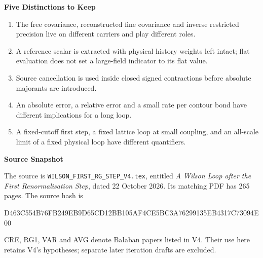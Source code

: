 \documentclass[11pt,a4paper]{article}
\newcommand{\subhead}[1]{\par\vspace{4pt}\textbf{\color{ink}#1}\par}
\begin{document}
\subhead{Five Distinctions to Keep}
\begin{enumerate}
    \item The free covariance, reconstructed fine covariance and inverse restricted precision live on different carriers and play different roles.
    \item A reference scalar is extracted with physical history weights left intact; flat evaluation does not set a large-field indicator to its flat value.
    \item Source cancellation is used inside closed signed contractions before absolute majorants are introduced.
    \item An absolute error, a relative error and a small rate per contour bond have different implications for a long loop.
    \item A fixed-cutoff first step, a fixed lattice loop at small coupling, and an all-scale limit of a fixed physical loop have different quantifiers.
\end{enumerate}

\subhead{Source Snapshot}
The source is \texttt{WILSON\_FIRST\_RG\_STEP\_V4.tex}, entitled \emph{A Wilson Loop after the First Renormalisation Step}, dated 22 October 2026. Its matching PDF has 265 pages. The source hash is

{\footnotesize\ttfamily
    D463C554B76FB249EB9D65CD12BB105AF4CE5BC3A76299135EB4317C73094E00\par}

CRE, RG1, VAR and AVG denote Ba{\l}aban papers listed in V4. Their use here retains V4's hypotheses; separate later iteration drafts are excluded.
\end{document}
